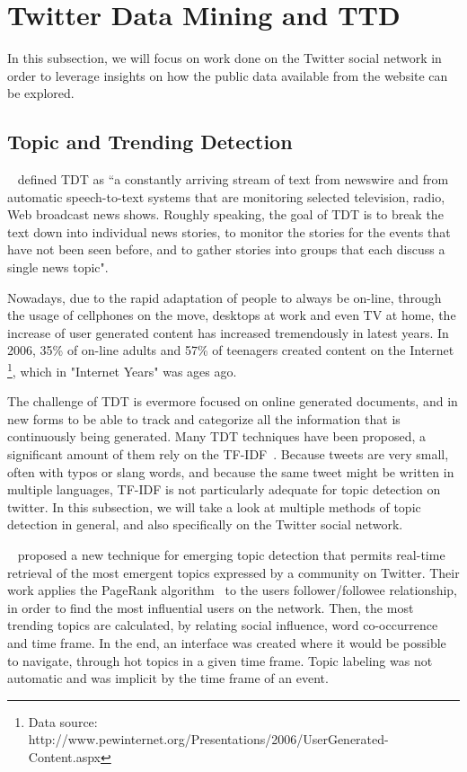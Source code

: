 \documentclass[journal]{IEEEtran}
\begin{document}
\section{Twitter Data Mining and TTD} 
\label{sec:data_mining_in_twitter_}

In this subsection, we will focus on work done on the Twitter social network in order to leverage insights on how the public data available from the website can be explored. 

\subsection{Topic and Trending Detection} 
\label{sub:real_time_topic_and_trending_detection}

~\citet{allan2002topic} defined \ac{TDT} as “a constantly arriving stream of text from newswire and from automatic speech-to-text systems that are monitoring selected television, radio, Web broadcast news shows. Roughly speaking, the goal of \ac{TDT} is to break the text down into individual news stories, to monitor the stories for the events that have not been seen before, and to gather stories into groups that each discuss a single news topic".

Nowadays, due to the rapid adaptation of people to always be on-line, through the usage of cellphones on the move, desktops at work and even TV at home, the increase of user generated content has increased tremendously in latest years. In 2006, 35\% of on-line adults and 57\% of teenagers created content on the Internet \footnote{ Data source: http://www.pewinternet.org/Presentations/2006/UserGenerated-Content.aspx}, which in "Internet Years" was ages ago. 

The challenge of \ac{TDT} is evermore focused on online generated documents, and in new forms to be able to track and categorize all the information that is continuously being generated.
Many \ac{TDT} techniques have been proposed,  a significant amount of them rely on the \ac{TF-IDF}~\cite{Baeza-Yates:1999:MIR:553876}. Because tweets are very small, often with typos or slang words, and because the same tweet might be written in multiple languages, \ac{TF-IDF} is not particularly adequate for topic detection on twitter. In this subsection, we will take a look at multiple methods of topic detection in general, and also specifically on the Twitter social network.

~\citet{Cataldi2010} proposed a new technique for emerging topic detection that permits real-time retrieval of the most emergent topics expressed by a community on Twitter. Their work applies the PageRank algorithm~\cite{Pagerank1998} to the users follower/followee relationship, in order to find the most influential users on the network. Then, the most trending topics are calculated, by relating social influence, word co-occurrence and time frame. In the end, an interface was created where it would be possible to navigate, through hot topics in a given time frame. Topic labeling was not automatic and was implicit by the time frame of an event.
\end{document}
